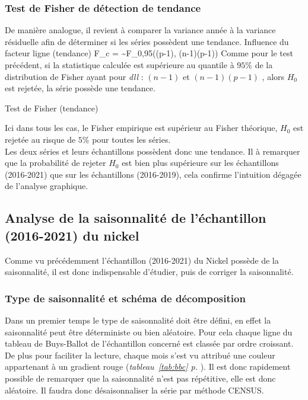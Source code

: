 \subsubsection{Test de Fisher de détection de tendance}
De manière analogue, il revient à comparer la variance année à la variance résiduelle afin de déterminer si les séries possèdent une tendance.
    {Influence du facteur ligne (tendance)}
    {F_{c} =  \sim F_{0,95}((p-1), (n-1)(p-1))}
Comme pour le test précédent, si la statistique calculée est supérieure au quantile à $ 95\% $ 
de la distribution de Fisher ayant pour \textit{dll} : $(n-1)$ et $(n-1)(p-1)$ , alors $ H_{0} $ est rejetée, la série possède une tendance.
\begin{table}[H]
    \centering
    \caption{Test de Fisher (tendance)}
    \sffamily
    
\end{table}
Ici dans tous les cas, le Fisher empirique est supérieur au Fisher théorique, $H_{0}$ est rejetée
au risque de $ 5\% $ pour toutes les séries. \\[11pt]
Les deux séries et leurs échantillons possèdent donc une tendance. Il à remarquer que la probabilité de rejeter 
$H_{0}$ est bien plus supérieure sur les échantillons (2016-2021) que sur les échantillons (2016-2019),
cela confirme l'intuition dégagée de l'analyse graphique.

\subsection{Analyse de la saisonnalité de l'échantillon (2016-2021) du nickel}
Comme vu précédemment l'échantillon (2016-2021) du Nickel possède de la saisonnalité, il est donc indispensable d'étudier, puis de corriger la saisonnalité. 
\subsubsection{Type de saisonnalité et schéma de décomposition}
Dans un premier temps le type de saisonnalité doit être défini, en effet la saisonnalité peut être déterministe ou bien aléatoire. Pour cela chaque ligne du tableau de 
Buys-Ballot de l'échantillon concerné est classée par ordre croissant. De plus pour faciliter la lecture, chaque mois s'est vu attribué une couleur appartenant à
un gradient rouge (\textit{tableau~\ref{tab:bbc} p.\pageref{tab:bbc} }). Il est donc rapidement possible de remarquer que la saisonnalité n'est pas répétitive,
elle est donc aléatoire. Il faudra donc désaisonnaliser la série par méthode CENSUS.\\[11pt] 

